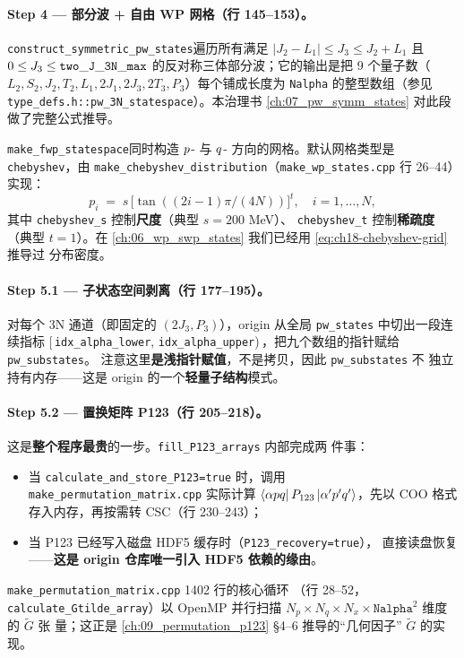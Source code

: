 \paragraph{Step 4 — 部分波 + 自由 WP 网格（行 145--153）。}
\texttt{construct\_symmetric\_pw\_states}\;遍历所有满足
$|J_2 - L_1| \le J_3 \le J_2 + L_1$ 且 $0 \le J_3 \le \tt{two\_J\_3N\_max}$
的反对称三体部分波；它的输出是把 9 个量子数（$L_2, S_2, J_2, T_2, L_1,
2J_1, 2J_3, 2T_3, P_3$）每个铺成长度为 \texttt{Nalpha} 的整型数组（参见
\texttt{type\_defs.h::pw\_3N\_statespace}）。本治理书 \cref{ch:07_pw_symm_states}
对此段做了完整公式推导。

\texttt{make\_fwp\_statespace}\;同时构造 $p$- 与 $q$-
方向的网格。默认网格类型是 \texttt{chebyshev}，由
\texttt{make\_chebyshev\_distribution}（\texttt{make\_wp\_states.cpp} 行
26--44）实现：
\begin{equation}
p_i \;=\; s\,\bigl[\tan( (2i-1)\pi/(4N) )\bigr]^{t},
\quad i = 1, \ldots, N,
\label{eq:ch18-chebyshev-grid}
\end{equation}
其中 \texttt{chebyshev\_s} 控制\textbf{尺度}（典型 $s = 200$ MeV）、
\texttt{chebyshev\_t} 控制\textbf{稀疏度}（典型 $t = 1$）。在
\cref{ch:06_wp_swp_states} 我们已经用 \cref{eq:ch18-chebyshev-grid} 推导过
分布密度。

\paragraph{Step 5.1 — 子状态空间剥离（行 177--195）。}
对每个 3N 通道（即固定的 $(2J_3, P_3)$），origin 从全局
\texttt{pw\_states} 中切出一段连续指标 $[\,$\texttt{idx\_alpha\_lower},
\texttt{idx\_alpha\_upper})$\,$，把九个数组的指针赋给 \texttt{pw\_substates}。
注意这里\textbf{是浅指针赋值}，不是拷贝，因此 \texttt{pw\_substates} 不
独立持有内存——这是 origin 的一个\textbf{轻量子结构}模式。

\paragraph{Step 5.2 — 置换矩阵 P123（行 205--218）。}
这是\textbf{整个程序最贵}的一步。\texttt{fill\_P123\_arrays} 内部完成两
件事：
\begin{itemize}
\item 当 \texttt{calculate\_and\_store\_P123=true} 时，调用
      \texttt{make\_permutation\_matrix.cpp} 实际计算
      $\bra{\alpha p q}P_{123}\ket{\alpha' p' q'}$，先以 COO 格式
      存入内存，再按需转 CSC（行 230--243）；
\item 当 P123 已经写入磁盘 HDF5 缓存时（\texttt{P123\_recovery=true}），
      直接读盘恢复——\textbf{这是 origin 仓库唯一引入 HDF5 依赖的缘由}。
\end{itemize}
\texttt{make\_permutation\_matrix.cpp} 1402 行的核心循环
（行 28--52，\texttt{calculate\_Gtilde\_array}）以 OpenMP 并行扫描
$N_p \times N_q \times N_x \times \mathtt{Nalpha}^2$ 维度的 $\tilde G$ 张
量；这正是 \cref{ch:09_permutation_p123} §4--6 推导的“几何因子”
$\tilde G$ 的实现。

